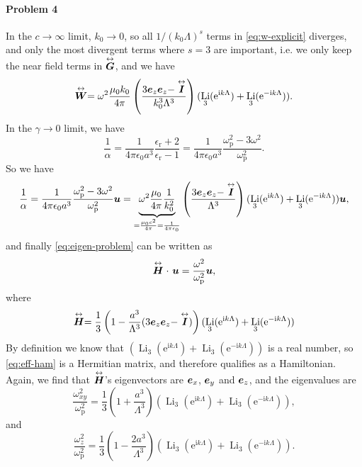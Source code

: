 \documentclass[hyperref, a4paper]{article}
\newcommand*{\ii}{\mathrm{i}}
\newcommand*{\ee}{\mathrm{e}}
\DeclareMathOperator{\li}{Li}
\renewcommand{\tensor}[1]{ \stackrel{\leftrightarrow}{\vb*{#1}}}
\begin{document}
\paragraph{Problem 4} In the $c \to \infty$ limit, $k_0 \to 0$, so all $1 / (k_0 \Lambda)^s$ terms in \eqref{eq:w-explicit} diverges,
and only the most divergent terms where $s=3$ are important, i.e. we only keep the near field terms 
in $\tensor{\vb*{G}}$, and we have 
\[
    \tensor{\vb*{W}} = \omega^2 \frac{\mu_0 k_0}{4 \pi} \left( \frac{3 \vb*{e}_z \vb*{e}_z - \tensor{\vb*{I}}}{k_0^3 \Lambda^3} \right) (\li_3(\ee^{\ii k \Lambda}) + \li_3 (\ee^{- \ii k \Lambda})).
\] 
In the $\gamma \to 0$ limit, we have 
\[
    \frac{1}{\alpha} = \frac{1}{4 \pi \epsilon_0 a^3} \frac{\epsilon_\text{r} + 2}{\epsilon_\text{r} - 1}
    = \frac{1}{4 \pi \epsilon_0 a^3} \frac{\omega_\text{p}^2 - 3 \omega^2}{\omega_\text{p}^2}. 
\]
So we have 
\[
    \frac{1}{\alpha} = \frac{1}{4 \pi \epsilon_0 a^3} \frac{\omega_\text{p}^2 - 3 \omega^2}{\omega_\text{p}^2} \vb*{u} = \underbrace{\omega^2 \frac{\mu_0 }{4 \pi} \frac{1}{k_0^2}}_{= \frac{\mu_0 c^2}{4\pi} = \frac{1}{4 \pi \epsilon_0}} \left( \frac{3 \vb*{e}_z \vb*{e}_z - \tensor{\vb*{I}}}{ \Lambda^3} \right) (\li_3(\ee^{\ii k \Lambda}) + \li_3 (\ee^{- \ii k \Lambda})) \vb*{u},
\]
and finally \eqref{eq:eigen-problem} can be written as 
\begin{equation}
    \tensor{\vb*{H}} \cdot \ \vb*{u} = \frac{\omega^2}{\omega_\text{p}^2} \vb*{u},
\end{equation}
where 
\begin{equation}
    \tensor{\vb*{H}} = \frac{1}{3} \left(1 - \frac{a^3}{\Lambda^3} (3 \vb*{e}_z \vb*{e}_z - \tensor{\vb*{I}}) \right) (\li_3(\ee^{\ii k \Lambda}) + \li_3 (\ee^{- \ii k \Lambda}))
    \label{eq:eff-ham}
\end{equation}
By definition we know that $(\li_3(\ee^{\ii k \Lambda}) + \li_3 (\ee^{- \ii k \Lambda}))$ is a real number, so 
\eqref{eq:eff-ham} is a Hermitian matrix, and therefore qualifies as a Hamiltonian. Again, we find that 
$\tensor{\vb*{H}}$'s eigenvectors are $\vb*{e}_x$, $\vb*{e}_y$ and $\vb*{e}_z$, and the eigenvalues are 
\begin{equation}
    \frac{\omega_{xy}^2}{\omega_\text{p}^2} = \frac{1}{3} \left( 1 + \frac{a^3}{\Lambda^3} \right) (\li_3(\ee^{\ii k \Lambda}) + \li_3 (\ee^{- \ii k \Lambda})),
\end{equation}
and 
\begin{equation}
    \frac{\omega_{z}^2}{\omega_\text{p}^2} = \frac{1}{3} \left( 1 - \frac{2a^3}{\Lambda^3} \right) (\li_3(\ee^{\ii k \Lambda}) + \li_3 (\ee^{- \ii k \Lambda})).
\end{equation}
\end{document}
